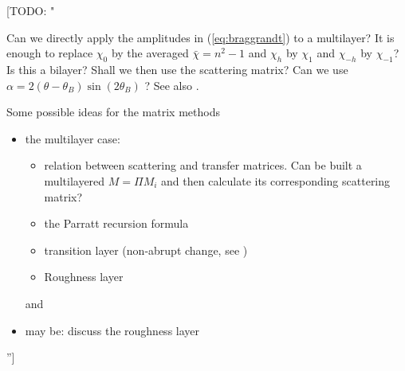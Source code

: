 \documentclass[preprint]{iucr}              %
\newcommand{\todo}[1]{{\color{red}[TODO: "#1'']}}
\begin{document}
\todo{ 

Can we directly apply the amplitudes in (\ref{eq:braggrandt}) to a multilayer? It is enough to replace $\chi_0$ by the averaged $\bar{\chi}=n^2-1$ and $\chi_h$ by $\chi_1$ and $\chi_{-h}$ by $\chi_{-1}$? Is this a bilayer? Shall we then use the scattering matrix? 
Can we use $\alpha=2(\theta-\theta_B)\sin(2\theta_B)$ ?
See also \cite{Osterhoff2012,Osterhoff2013}.

Some possible ideas for the matrix methods
\begin{itemize}
    \item the multilayer case:
    \begin{itemize}
        \item relation between scattering and transfer matrices. Can be built a multilayered $M=\Pi M_i$ and then calculate its corresponding scattering matrix?
        \item the Parratt recursion formula
        \item transition layer (non-abrupt change, see \cite{Lobach})
        \item Roughness layer
    \end{itemize}and 
    \item may be: discuss the roughness layer

\end{itemize}
}






\end{document}
